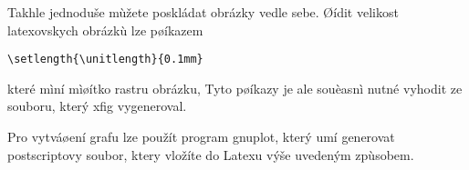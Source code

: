 \documentclass[12pt]{article}
\begin{document}
Takhle jednoduše mùžete poskládat obrázky vedle sebe.
Øídit velikost latexovskych obrázkù lze pøíkazem
\begin{verbatim}
\setlength{\unitlength}{0.1mm}
\end{verbatim}
které mìní mìøítko rastru obrázku, Tyto pøíkazy je ale souèasnì
nutné vyhodit ze souboru, který xfig vygeneroval.

Pro vytváøení grafu lze použít program gnuplot, který umí generovat
postscriptovy soubor, ktery vložíte do Latexu výše uvedeným
zpùsobem.
\end{document}

